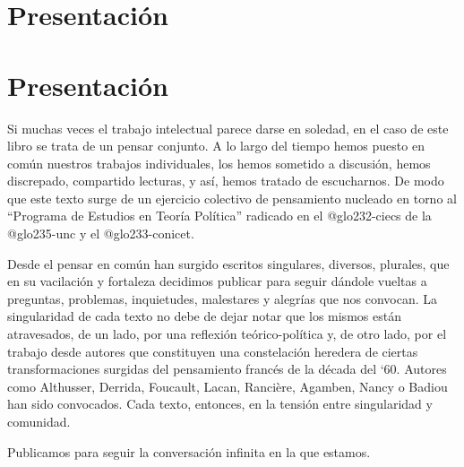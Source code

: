 \ifPDF
\chapter[\hspace{0pc}Presentación]{Presentación} %
\setcounter{PrimPag}{\theCurrentPage}

	\else
	\ifHTMLEPUB
	\chapter{Presentación}
	\fi
\fi

Si muchas veces el trabajo intelectual parece darse en soledad, en el caso de este libro se trata de un pensar conjunto. A lo largo del tiempo hemos puesto en común nuestros trabajos individuales, los hemos sometido a discusión, hemos discrepado, compartido lecturas, y así, hemos tratado de escucharnos. De modo que este texto surge de un ejercicio colectivo de pensamiento nucleado en torno al \enquote{Programa de Estudios en Teoría Política} radicado en el \gls{@glo232-ciecs} de la \gls{@glo235-unc} y el \gls{@glo233-conicet}.

Desde el pensar en común han surgido escritos singulares, diversos, plurales, que en su vacilación y fortaleza decidimos publicar para seguir dándole vueltas a preguntas, problemas, inquietudes, malestares y alegrías que nos convocan. La singularidad de cada texto no debe de dejar notar que los mismos están atravesados, de un lado, por una reflexión teórico-política y, de otro lado, por el trabajo desde autores que constituyen una constelación heredera de ciertas transformaciones surgidas del pensamiento francés de la década del `60. Autores como Althusser, Derrida, Foucault, Lacan, Rancière, Agamben, Nancy o Badiou han sido convocados. Cada texto, entonces, en la tensión entre singularidad y comunidad.

Publicamos para seguir la conversación infinita en la que estamos.

\ifPDF
{}
\fi